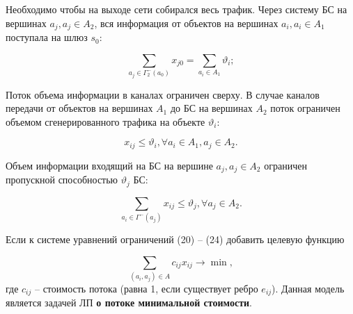 \begin{frame}

    \fontsize{10pt}{5.2}\selectfont
    \justifying

    Необходимо чтобы на выходе сети собирался весь трафик. Через систему БС на вершинах $a_j, a_j \in A_2$, вся информация от объектов на вершинах $a_i, a_i \in A_1$ поступала  на шлюз $s_0$:

    \begin{equation}\label{eq:part2_1.3}
        \sum_{a_j \in \Gamma_2^-(a_0)} x_{j0} =  \sum_{a_i \in A_1} \vartheta_i;
    \end{equation}


    Поток объема информации в каналах ограничен сверху. В случае каналов передачи от объектов на вершинах $A_1$ до БС на вершинах $A_2$ поток ограничен объемом сгенерированного трафика на объекте $\vartheta_i$:


    \begin{equation}\label{eq:part2_1.4_1}
        x_{ij} \leqslant \vartheta_i, \forall a_i \in A_1, a_j \in A_2.
    \end{equation}

    Объем информации входящий на БС на вершине $a_j, a_j \in A_2$ ограничен пропускной способностью $\vartheta_j$ БС: 


    \begin{equation}\label{eq:part2_1.4_2}
        \sum_{a_i \in \Gamma^-(a_j)} x_{ij} \leqslant \vartheta_j, \forall a_j \in A_2.
    \end{equation}


    Если к системе уравнений ограничений (20) -- (24) добавить целевую функцию

    \begin{equation}
        \label{eq:part2_1.5}
        \sum_{(a_i, a_j) \in A} c_{ij} x_{ij} \rightarrow \min ,
    \end{equation}
    где $c_{ij}$ -- стоимость потока (равна 1, если существует ребро $e_{ij}$). 
    \medskip
    Данная модель является задачей ЛП \textbf{о потоке минимальной стоимости}. 

\end{frame}

